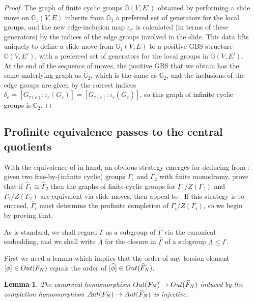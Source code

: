 \documentclass[11pt, a4 paper]{amsart}
\numberwithin{equation}{section}
\newtheorem{lemma}[theorem]{Lemma}
\theoremstyle{remark}
\theoremstyle{definition}
\def\-{\overline}
\def\wh{\widehat}
\def\aut{{\rm{Aut}}}
\def\out{{\rm{Out}}}
\def\GG{\mathbb{G}}
\def\d{\delta}
\def\t{\tau}
\def\-{\overline}
\begin{document}
\begin{proof} 
	The graph of finite cyclic groups $\-{\GG}(V,E')$ 
	obtained by performing a slide move on $\-{\GG}_1(V,E)$ 
	inherits from $\-{\GG}_1$ 
	a preferred set of generators for the local groups, 
	and the new edge-inclusion map $\iota_{e'}$ 
	is calculated (in terms of these generators) 
	by the indices of the edge groups involved in the slide. 
	This data lifts uniquely to define a slide move 
	from $\GG_1(V,E)$ to a positive GBS structure $\GG(V,E')$, 
	with a preferred set of generators 
	for the local groups in $\GG(V,E')$. 
	At the end of the sequence of moves, 
	the positive GBS that we obtain 
	has the same underlying graph as $\-{\GG}_2$, 
	which is the same as $\GG_2$, 
	and the inclusions of the edge groups 
	are given by the correct indices 
	$\d_e = [G_{\t(e)}: \iota_e(G_e)] 
		= [\-G_{\t(e)}: \iota_e(\-G_e)]$, 
	so this graph of infinite cyclic groups is $\GG_2$. 
\end{proof}


\subsection{Profinite equivalence passes to the central quotients}

With the equivalence of  in hand, 
an obvious strategy emerges for deducing  
from : 
given two free-by-(infinite cyclic) groups 
$\Gamma_1$ and $\Gamma_2$ with finite monodromy, 
prove that if $\widehat{\Gamma}_1 \cong \widehat{\Gamma}_2$ 
then the graphs of finite-cyclic groups for 
$\Gamma_1/Z(\Gamma_1)$ and $\Gamma_2/Z(\Gamma_2)$ 
are equivalent via slide moves, 
then appeal to . 
If this strategy is to succeed, 
$\wh{\Gamma}_i$ must determine 
the profinite completion of $\Gamma_i/Z(\Gamma_i)$, 
so we begin by proving that. 

As is standard, we shall regard $\Gamma$ 
as a subgroup of $\wh{\Gamma}$ via the canonical embedding, 
and we shall write $\overline{\Lambda}$ 
for the closure in $\wh{\Gamma}$ 
of a subgroup $\Lambda \leq \Gamma$. 

First we need a lemma which implies 
that the order of any torsion element $[\phi]\in\out(F_N)$ 
equals the order of $[\widehat{\phi}]\in\out(\widehat{F}_N)$. 

\begin{lemma}
\label{inner-after-completion}
	The canonical homomorphism $\out(F_N) \to \out(\widehat{F}_N)$ 
	induced by the completion homomorphism 
	$\aut(F_N) \to \aut(\wh{F}_N)$ 
	is injective. 
\end{lemma}
\end{document}
